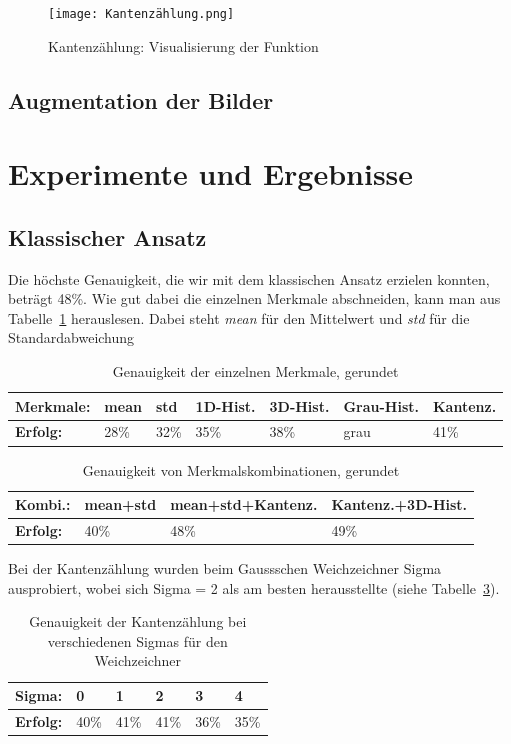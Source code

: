 \documentclass[a4,german]{article}
\begin{document}
\begin{figure}[h!]
\centering
\texttt{[image: Kantenzählung.png]}
\caption{Kantenzählung: Visualisierung der Funktion}
    \label{fig:kaz}
\end{figure}

\subsection{Augmentation der Bilder}




\section{Experimente und Ergebnisse}

\subsection{Klassischer Ansatz}%
Die höchste Genauigkeit, die wir mit dem klassischen Ansatz erzielen konnten, beträgt 48\%. Wie gut dabei die einzelnen Merkmale abschneiden, kann man aus Tabelle~\ref{tab:gen} herauslesen. Dabei steht \textit{mean} für den Mittelwert und \textit{std} für die Standardabweichung
\begin{table}[h]
\begin{tabular}{|l|l|l|l|l|l|l|}
 \hline
 \textbf{Merkmale:}&mean&std&1D-Hist.&3D-Hist.&Grau-Hist.&Kantenz.\\
 \hline
 \textbf{Erfolg:} & 28\% & 32\% & 35\% & 38\% & grau & 41\% \\
 \hline
\end{tabular}
\caption{Genauigkeit der einzelnen Merkmale, gerundet}
\label{tab:gen}
\end{table}

\begin{table}[h]
\begin{tabular}{|l|l|l|l|}
 \hline
 \textbf{Kombi.:}&mean+std&mean+std+Kantenz.&Kantenz.+3D-Hist.\\
 \hline
 \textbf{Erfolg:} & 40\% & 48\% & 49\% \\
 \hline
\end{tabular}
\caption{Genauigkeit von Merkmalskombinationen, gerundet}
\label{tab:gen2}
\end{table}

Bei der Kantenzählung wurden beim Gaussschen Weichzeichner Sigma ausprobiert, wobei sich Sigma = 2 als am besten herausstellte (siehe Tabelle~\ref{tab:sigma}).
\begin{table}[h]
\begin{tabular}{|l|l|l|l|l|l|}
 \hline
 \textbf{Sigma:} & 0 & 1 & 2 & 3 & 4\\
 \hline
 \textbf{Erfolg:} & 40\% & 41\% & 41\% & 36\% & 35\% \\
 \hline
\end{tabular}
\caption{Genauigkeit der Kantenzählung bei verschiedenen Sigmas für den Weichzeichner}
\label{tab:sigma}
\end{table}
\end{document}
